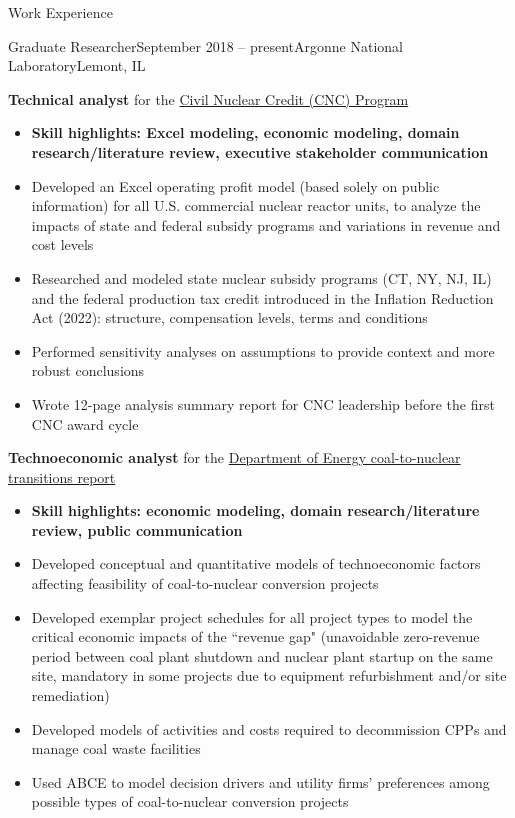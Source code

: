 \documentclass{resume} %
\begin{document}
\begin{rSection}{Work Experience}
\begin{rSubsection}{Graduate Researcher}{September 2018 -- present}{Argonne National Laboratory}{Lemont, IL}
  \item \textbf{Technical analyst} for the \href{https://www.energy.gov/gdo/civil-nuclear-credit-program}{Civil Nuclear Credit (CNC) Program}
  \begin{itemize}
    \setlength{\itemsep}{-3pt}
    \item \textbf{Skill highlights: Excel modeling, economic modeling, domain research/literature review, executive stakeholder communication}
    \item Developed an Excel operating profit model (based solely on public information) for all U.S. commercial nuclear reactor units, to analyze the impacts of state and federal subsidy programs and variations in revenue and cost levels
    \item Researched and modeled state nuclear subsidy programs (CT, NY, NJ, IL) and the federal production tax credit introduced in the Inflation Reduction Act (2022): structure, compensation levels, terms and conditions
    \item Performed sensitivity analyses on assumptions to provide context and more robust conclusions
    \item Wrote 12-page analysis summary report for CNC leadership before the first CNC award cycle
  \end{itemize}

  \item \textbf{Technoeconomic analyst} for the \href{https://www.energy.gov/ne/articles/doe-report-finds-hundreds-retiring-coal-plant-sites-could-convert-nuclear}{Department of Energy coal-to-nuclear transitions report}
  \begin{itemize}
    \setlength{\itemsep}{-3pt}
    \item \textbf{Skill highlights: economic modeling, domain research/literature review, public communication}
    \item Developed conceptual and quantitative models of technoeconomic factors affecting feasibility of coal-to-nuclear conversion projects
    \item Developed exemplar project schedules for all project types to model the critical economic impacts of the ``revenue gap" (unavoidable zero-revenue period between coal plant shutdown and nuclear plant startup on the same site, mandatory in some projects due to equipment refurbishment and/or site remediation)
    \item Developed models of activities and costs required to decommission CPPs and manage coal waste facilities
    \item Used ABCE to model decision drivers and utility firms' preferences among possible types of coal-to-nuclear conversion projects
  \end{itemize}


\end{rSubsection}
\end{rSection}
\end{document}
